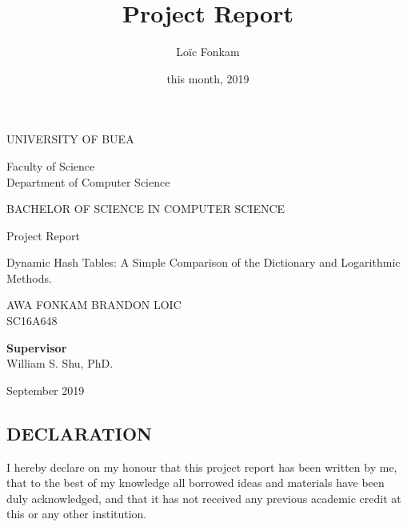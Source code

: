 \documentclass[a4paper,12pt, openany]{book}
\title{Project Report}
\author{Loïc Fonkam}
\date{this month, 2019}
\begin{document}
\thispagestyle{empty}
\linespread{1.25}      %
\begin{center}
	\begin{LARGE}
		 UNIVERSITY OF BUEA
	\end{LARGE}
	\bigbreak
	\vspace*{0.5in}
	Faculty of Science \\[.5cm]
	
	Department of Computer Science
	
	
	
	\begin{center}
		
		
		\vspace*{0.8in} 
		\begin{LARGE}
			\begin{doublespace}
					 BACHELOR OF SCIENCE IN COMPUTER SCIENCE
			\end{doublespace}

		\end{LARGE}  
	\bigbreak
		Project Report\\[.2cm]
		\begin{Large}
			Dynamic Hash Tables: A Simple Comparison of the Dictionary and Logarithmic Methods.
		\end{Large}\bigbreak
		
		
		
	\end{center}
	
	
	
	
	\begin{center}
		
		
		\vspace*{1in}
		
		\textsc{ AWA FONKAM BRANDON LOIC } \\
		\textsc{SC16A648}
		
		
		
		
		
		
		\vspace*{0.7in}  \textbf{Supervisor} \\
		\vspace{0.1in}  William S. Shu, PhD.
	
		\vspace*{1.3in}
		{\large September 2019}
	\end{center}
\end{center}

\newpage
\vspace*{1in}
\setcounter{page}{1}
\vspace*{0.1\textheight}
\begin{center}
	\section*{DECLARATION}
	\vspace*{.2in}
\end{center}
I hereby declare on my honour that this project report has been written by me, that to the best of my knowledge all borrowed ideas and materials have been duly acknowledged, and that it has not received any previous academic credit at this or any other institution.\\[1cm]
\end{document}
